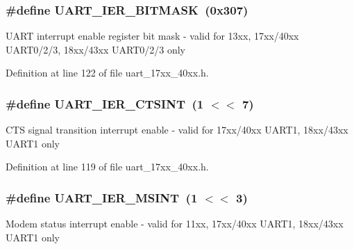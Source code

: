 \subsubsection[{\texorpdfstring{U\+A\+R\+T\+\_\+\+I\+E\+R\+\_\+\+B\+I\+T\+M\+A\+SK}{UART_IER_BITMASK}}]{\setlength{\rightskip}{0pt plus 5cm}\#define U\+A\+R\+T\+\_\+\+I\+E\+R\+\_\+\+B\+I\+T\+M\+A\+SK~(0x307)}\hypertarget{group__UART__17XX__40XX_ga101e57e41855d1262e9d9b747854542f}{}\label{group__UART__17XX__40XX_ga101e57e41855d1262e9d9b747854542f}
U\+A\+RT interrupt enable register bit mask -\/ valid for 13xx, 17xx/40xx U\+A\+R\+T0/2/3, 18xx/43xx U\+A\+R\+T0/2/3 only 

Definition at line 122 of file uart\+\_\+17xx\+\_\+40xx.\+h.

\subsubsection[{\texorpdfstring{U\+A\+R\+T\+\_\+\+I\+E\+R\+\_\+\+C\+T\+S\+I\+NT}{UART_IER_CTSINT}}]{\setlength{\rightskip}{0pt plus 5cm}\#define U\+A\+R\+T\+\_\+\+I\+E\+R\+\_\+\+C\+T\+S\+I\+NT~(1 $<$$<$ 7)}\hypertarget{group__UART__17XX__40XX_ga1dd8f89b44fd3a2b0d22dd7c6ad4fe5f}{}\label{group__UART__17XX__40XX_ga1dd8f89b44fd3a2b0d22dd7c6ad4fe5f}
C\+TS signal transition interrupt enable -\/ valid for 17xx/40xx U\+A\+R\+T1, 18xx/43xx U\+A\+R\+T1 only 

Definition at line 119 of file uart\+\_\+17xx\+\_\+40xx.\+h.

\subsubsection[{\texorpdfstring{U\+A\+R\+T\+\_\+\+I\+E\+R\+\_\+\+M\+S\+I\+NT}{UART_IER_MSINT}}]{\setlength{\rightskip}{0pt plus 5cm}\#define U\+A\+R\+T\+\_\+\+I\+E\+R\+\_\+\+M\+S\+I\+NT~(1 $<$$<$ 3)}\hypertarget{group__UART__17XX__40XX_ga149affc2ce17a660a640f26d3212a624}{}\label{group__UART__17XX__40XX_ga149affc2ce17a660a640f26d3212a624}
Modem status interrupt enable -\/ valid for 11xx, 17xx/40xx U\+A\+R\+T1, 18xx/43xx U\+A\+R\+T1 only 

